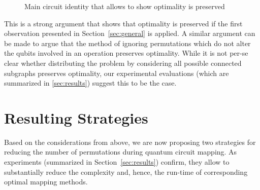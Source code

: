 \documentclass[10pt,conference]{IEEEtran}
\begin{document}
  \begin{figure}[t]
    \centering
    \hfill    
    \caption{Main circuit identity that allows to show optimality is preserved}\label{fig:executionorder}\vspace*{-0em}
\end{figure}
 
 This is a strong argument that shows that optimality is preserved if the first observation presented in Section~\ref{sec:general} is applied. 
 A similar argument can be made to argue that the method of ignoring permutations which do not alter the qubits involved in an operation preserves optimality. 
While it is not per-se clear whether distributing the problem by considering all possible connected subgraphs preserves optimality, our experimental evaluations (which are summarized in \autoref{sec:results}) suggest this to be the case.

\section{Resulting Strategies}\label{sec:heuristics}

Based on the considerations from above, we are now proposing two strategies for reducing the number of permutations during quantum circuit mapping. 
As experiments (summarized in Section~\ref{sec:results}) confirm, they allow to substantially reduce the complexity and, hence, the run-time of corresponding optimal mapping methods.
\end{document}
